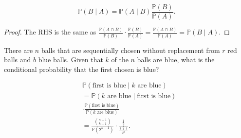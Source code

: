 \begin{lemma}
	\[
		\mathbb{P}(B\mid A)=\mathbb{P}(A\mid B)\frac{\mathbb{P}(B)}{\mathbb{P}(A)}
	.\] 
\end{lemma}
\begin{proof}
	The RHS is the same as \( \frac{\mathbb{P}(A \cap B)}{\mathbb{P}(B)} \cdot \frac{\mathbb{P}(B)}{\mathbb{P}(A)} = \frac{\mathbb{P}(A \cap B)}{\mathbb{P}(A)} = \mathbb{P}(B\mid A) \).
\end{proof}

\begin{eg}
	There are \( n \) balls that are sequentially chosen without replacement from \( r \) red balls and \( b \) blue balls. Given that \( k \) of the \( n \) balls are blue, what is the conditional probability that the first chosen is blue?
\end{eg}
\begin{explanation}
	\begin{align*}
		& \mathbb{P}(\text{first is blue} \mid k\text{ are blue}) \\
	  &= \mathbb{P}(k\text{ are blue}\mid \text{first is blue}) \\
	  &\cdot \frac{\mathbb{P}(\text{first is blue})}{\mathbb{P}(k\text{ are blue})} \\
		&= \frac{\binom{n-1}{k-1}}{\mathbb{P}(2^{n-1} )} \cdot \frac{\frac{1}{2}}{\frac{\binom{n}{k}}{2^n}}
	.\end{align*}
\end{explanation}

